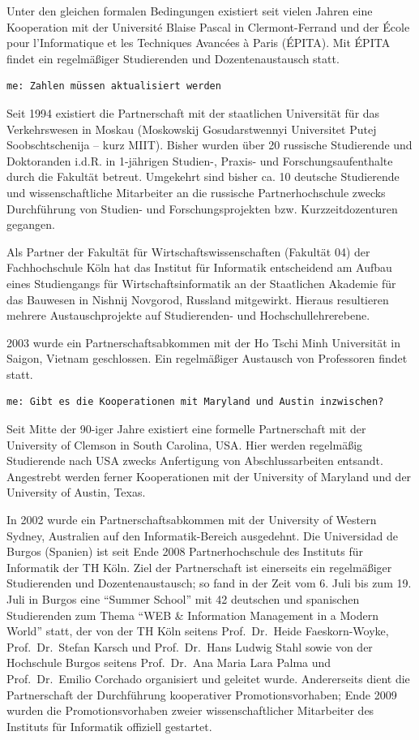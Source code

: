 Unter den gleichen formalen Bedingungen existiert seit vielen Jahren
eine Kooperation mit der Université Blaise Pascal in Clermont-Ferrand
und der École pour l'Informatique et les Techniques Avancées à Paris
(ÉPITA). Mit ÉPITA findet ein regelmäßiger Studierenden und
Dozentenaustausch statt.

\begin{verbatim}
me: Zahlen müssen aktualisiert werden
\end{verbatim}

Seit 1994 existiert die Partnerschaft mit der staatlichen Universität
für das Verkehrswesen in Moskau (Moskowskij Gosudarstwennyi Universitet
Putej Soobschtschenija -- kurz MIIT). Bisher wurden über 20 russische
Studierende und Doktoranden i.d.R. in 1-jährigen Studien-, Praxis- und
Forschungsaufenthalte durch die Fakultät betreut. Umgekehrt sind bisher
ca. 10 deutsche Studierende und wissenschaftliche Mitarbeiter an die
russische Partnerhochschule zwecks Durchführung von Studien- und
Forschungsprojekten bzw. Kurzzeitdozenturen gegangen.

Als Partner der Fakultät für Wirtschaftswissenschaften (Fakultät 04) der
Fachhochschule Köln hat das Institut für Informatik entscheidend am
Aufbau eines Studiengangs für Wirtschaftsinformatik an der Staatlichen
Akademie für das Bauwesen in Nishnij Novgorod, Russland mitgewirkt.
Hieraus resultieren mehrere Austauschprojekte auf Studierenden- und
Hochschullehrerebene.

2003 wurde ein Partnerschaftsabkommen mit der Ho Tschi Minh Universität
in Saigon, Vietnam geschlossen. Ein regelmäßiger Austausch von
Professoren findet statt.

\begin{verbatim}
me: Gibt es die Kooperationen mit Maryland und Austin inzwischen?
\end{verbatim}

Seit Mitte der 90-iger Jahre existiert eine formelle Partnerschaft mit
der University of Clemson in South Carolina, USA. Hier werden regelmäßig
Studierende nach USA zwecks Anfertigung von Abschlussarbeiten entsandt.
Angestrebt werden ferner Kooperationen mit der University of Maryland
und der University of Austin, Texas.

In 2002 wurde ein Partnerschaftsabkommen mit der University of Western
Sydney, Australien auf den Informatik-Bereich ausgedehnt. Die
Universidad de Burgos (Spanien) ist seit Ende 2008 Partnerhochschule des
Instituts für Informatik der TH Köln. Ziel der Partnerschaft ist
einerseits ein regelmäßiger Studierenden und Dozentenaustausch; so fand
in der Zeit vom 6. Juli bis zum 19. Juli in Burgos eine ``Summer
School'' mit 42 deutschen und spanischen Studierenden zum Thema ``WEB \&
Information Management in a Modern World'' statt, der von der TH Köln
seitens Prof.~Dr.~Heide Faeskorn-Woyke, Prof.~Dr.~Stefan Karsch und
Prof.~Dr.~Hans Ludwig Stahl sowie von der Hochschule Burgos seitens
Prof.~Dr.~Ana Maria Lara Palma und Prof.~Dr.~Emilio Corchado organisiert
und geleitet wurde. Andererseits dient die Partnerschaft der
Durchführung kooperativer Promotionsvorhaben; Ende 2009 wurden die
Promotionsvorhaben zweier wissenschaftlicher Mitarbeiter des Instituts
für Informatik offiziell gestartet.

